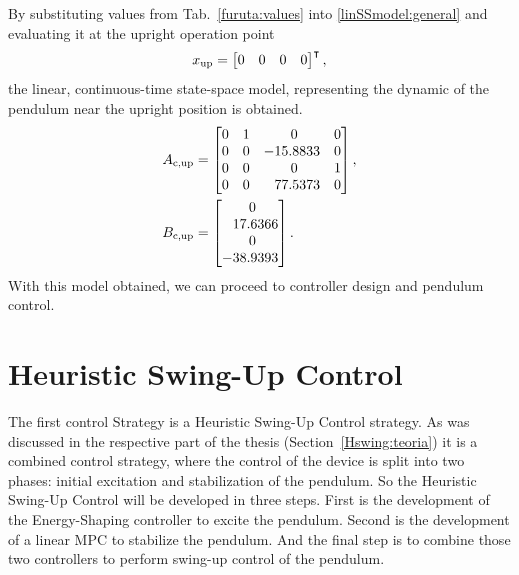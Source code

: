 By substituting values from Tab.~\ref{furuta:values} into \ref{linSSmodel:general} and evaluating it at the upright operation point 
\begin{equation}
x _{\text{up}} = \begin{bmatrix}0&0&0&0\end{bmatrix}^\intercal, 
\end{equation}
the linear, continuous-time state-space model, representing the dynamic of the pendulum near the upright position is obtained.
\begin{subequations}\label{linSSmodel:up}
	\begin{align}
	A _{\text{c,up}} &=\begin{bmatrix}
	0&1&\ 0& 0\\
	0&0&-15.8833&0\\
	0&0&\ 0&1\\
	0&0&\ \; \,77.5373&0
	\end{bmatrix},\\
	B _{\text{c,up}} &=\begin{bmatrix}
	\ 0\\
	\ \; \,17.6366\\
	\ 0\\
	-38.9393
	\end{bmatrix}.
	\end{align}
\end{subequations}
With this model obtained, we can proceed to controller design and pendulum control.
\section{Heuristic Swing-Up Control}
The first control Strategy is a Heuristic Swing-Up Control strategy. As was discussed in the respective part of the thesis (Section~\ref{Hswing:teoria}) it is a combined control strategy, where the control of the device is split into two phases: initial excitation and stabilization of the pendulum. So the Heuristic Swing-Up Control will be developed in three steps. First is the development of the Energy-Shaping controller to excite the pendulum. Second is the development of a linear MPC to stabilize the pendulum. And the final step is to combine those two controllers to perform swing-up control of the pendulum.
